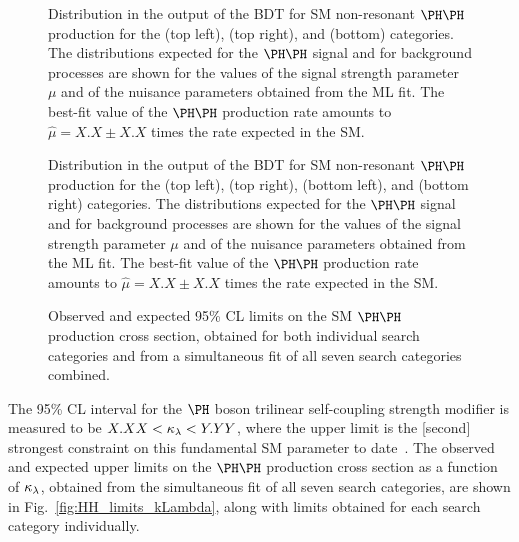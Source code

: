 \begin{figure}
  \caption{
    Distribution in the output of the BDT for SM non-resonant $\HH$ production
    for the \llss (top left), \lllnot (top right), and \llll (bottom) categories.
    The distributions expected for the $\HH$ signal and for background processes
    are shown for the values of the signal strength parameter $\mu$ 
    and of the nuisance parameters obtained from the ML fit.
    The best-fit value of the $\HH$ production rate amounts to $\hat{\mu} = X.X \pm X.X$ 
    times the rate expected in the SM.
  }
  \label{fig:postfitPlots1}
\end{figure}

\begin{figure}
  \caption{
    Distribution in the output of the BDT for SM non-resonant $\HH$ production
    for the \lllt (top left), \lltt (top right), \lttt (bottom left), and \noltttt (bottom right) categories.
    The distributions expected for the $\HH$ signal and for background processes
    are shown for the values of the signal strength parameter $\mu$ 
    and of the nuisance parameters obtained from the ML fit.
    The best-fit value of the $\HH$ production rate amounts to $\hat{\mu} = X.X \pm X.X$ 
    times the rate expected in the SM.
  }
  \label{fig:postfitPlots2}
\end{figure}

\begin{figure}
  \centering
  \caption{
    Observed and expected 95\% CL limits on the SM $\HH$ production cross section,
    obtained for both individual search categories
    and from a simultaneous fit of all seven search categories combined.
  }
  \label{fig:HH_limits_SM}
\end{figure}

The 95\% CL interval for the $\PHiggs$ boson trilinear self-coupling strength modifier
is measured to be $X.XX < \kappa_{\lambda} < Y.YY$, where the upper limit is the [second]
strongest constraint on this fundamental SM parameter to date~\cite{Sirunyan:2745738,Sirunyan:2018ayu,2020135103}.
The observed and expected upper limits on the $\HH$ production cross section as a function of
$\kappa_{\lambda}$, obtained from the simultaneous fit of all seven search categories, are shown in Fig.~\ref{fig:HH_limits_kLambda}, 
along with limits obtained for each search category individually.

